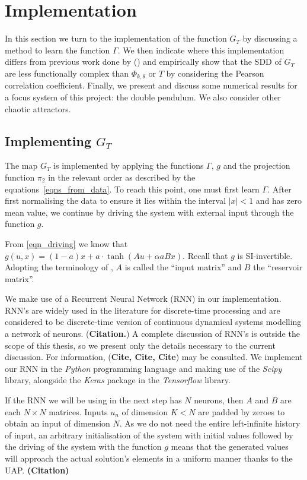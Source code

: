 \documentclass[a4paper,12pt,twoside]{report}
\begin{document}
\chapter{Implementation} \label{ch5}
 
In this section we turn to the implementation of the function $G_T$ by discussing a method to learn the function $\Gamma$. We then indicate where this implementation differs from previous work done by (\cite{manjunath2021universal}) and empirically show that the SDD of $G_T$ are less functionally complex than $\Phi_{k, \theta}$ or $T$ by considering the Pearson correlation coefficient. 
Finally, we present and discuss some numerical results for a focus system of this project: the double pendulum. We also consider other chaotic attractors.

\section{Implementing $G_T$}
The map $G_T$ is implemented by applying the functions $\Gamma$, $g$ and the projection function $\pi_2$ in the relevant order as described by the equations~\ref{eqns_from_data}. To reach this point, one must first learn $\Gamma$.
After first normalising the data to ensure it lies within the interval $|x| < 1$ and has zero mean value, we continue by driving the system with external input through the function $g$.

From \eqref{eqn_driving} we know that $ g(u,x)=(1-a)x+a{\cdot}\tanh(Au+\alpha{a}Bx)$. Recall that $g$ is SI-invertible. Adopting the terminology of \cite{manjunath2021universal}, $A$ is called the “input matrix” and $B$ the “reservoir matrix”. 

We make use of a Recurrent Neural Network (RNN) in our implementation. RNN's are widely used in the literature for discrete-time processing and are considered to be discrete-time version of continuous dynamical systems modelling a network of neurons. (\textbf{Citation.})
A complete discussion of RNN's is outside the scope of this thesis, so we present only the details necessary to the current discussion. For information, (\textbf{Cite, Cite, Cite}) may be consulted. We implement our RNN in the \emph{Python} programming language and making use of the \emph{Scipy} library, alongside the \emph{Keras} package in the \emph{Tensorflow} library.

If the RNN we will be using in the next step has $N$ neurons, then $A$ and $B$ are each $N\times{N}$ matrices. Inputs $u_n$ of dimension $K < N$ are padded by zeroes to obtain an input of dimension $N$. As we do not need the entire left-infinite history of input, an arbitrary initialisation of the system with initial values followed by the driving of the system with the function $g$ means that the generated values will approach the actual solution’s elements in a uniform manner thanks to the UAP. \textbf{(Citation)}
\end{document}
